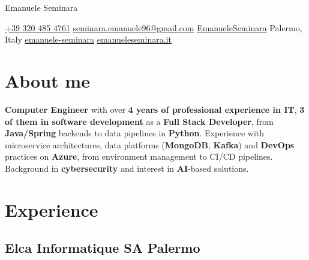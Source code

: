 \documentclass[11pt]{article}
\newcommand{\rside}[1]{
  \hfill {\normalfont\color{accent} #1}%
}
\begin{document}

\begin{center}
  {
    \fontsize{36}{12} 
    \selectfont
    \color{accent} 
    Emanuele Seminara
  } \\ \medskip

  \href{tel:+393204854761}{{\color{gray}{\faPhone}} +39 320 485 4761} \quad
  \href{mailto:seminara.emanuele96@gmail.com}{{\color{gray}{\faEnvelope}} seminara.emanuele96@gmail.com} \quad 
  \href{https://github.com/EmanueleSeminara}{{\color{gray}{\faGithub}} EmanueleSeminara} \quad \quad \quad \quad
  {\color{gray}{\faHome}} Palermo, Italy \quad
  \href{https://www.linkedin.com/in/emanuele-seminara/}{{\color{gray}{\faLinkedin}} emanuele-seminara} \quad
  \href{https://emanueleseminara.it/}{{\color{gray}{\faLink}} emanueleseminara.it} 
\end{center}



\section{About me}
\noindent \textbf{Computer Engineer} with over \textbf{4 years of professional experience in IT}, \textbf{3 of them in software development} as a \textbf{Full Stack Developer}, from \textbf{Java/Spring} backends to data pipelines in \textbf{Python}. Experience with microservice architectures, data platforms (\textbf{MongoDB}, \textbf{Kafka}) and \textbf{DevOps} practices on \textbf{Azure}, from environment management to CI/CD pipelines. Background in \textbf{cybersecurity} and interest in \textbf{AI}-based solutions.

\section{Experience}
\subsection{Elca Informatique SA \rside{Palermo}}
\end{document}
